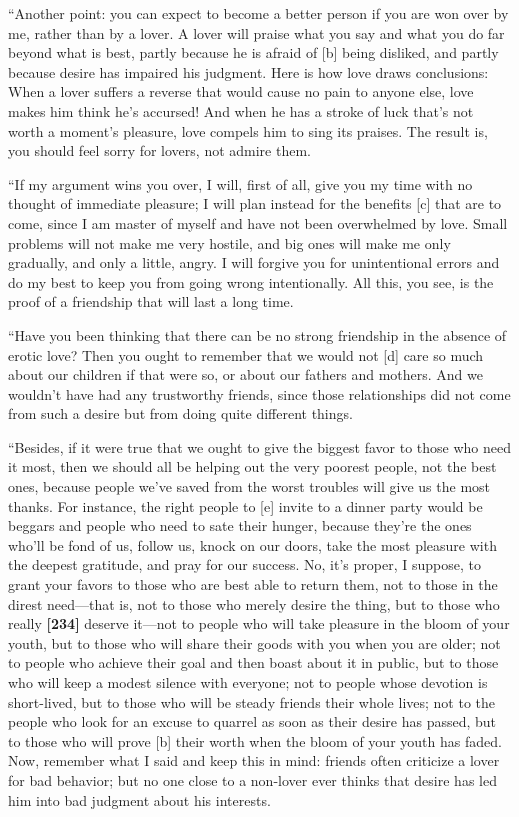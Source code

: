 “Another point: you can expect to become a better person if you are won
over by me, rather than by a lover. A lover will praise what you say and
what you do far beyond what is best, partly because he is afraid of
{[}b{]} being disliked, and partly because desire has impaired his
judgment. Here is how love draws conclusions: When a lover suffers a
reverse that would cause no pain to anyone else, love makes him think
he's accursed! And when he has a stroke of luck that's not worth a
moment's pleasure, love compels him to sing its praises. The result is,
you should feel sorry for lovers, not admire them.

“If my argument wins you over, I will, first of all, give you my time
with no thought of immediate pleasure; I will plan instead for the
benefits {[}c{]} that are to come, since I am master of myself and have
not been overwhelmed by love. Small problems will not make me very
hostile, and big ones will make me only gradually, and only a little,
angry. I will forgive you for unintentional errors and do my best to
keep you from going wrong intentionally. All this, you see, is the proof
of a friendship that will last a long time.

“Have you been thinking that there can be no strong friendship in the
absence of erotic love? Then you ought to remember that we would not
{[}d{]} care so much about our children if that were so, or about our
fathers and mothers. And we wouldn't have had any trustworthy friends,
since those relationships did not come from such a desire but from doing
quite different things.

“Besides, if it were true that we ought to give the biggest favor to
those who need it most, then we should all be helping out the very
poorest people, not the best ones, because people we've saved from the
worst troubles will give us the most thanks. For instance, the right
people to {[}e{]} invite to a dinner party would be beggars and people
who need to sate their hunger, because they're the ones who'll be fond
of us, follow us, knock on our
doors, take the most
pleasure with the deepest gratitude, and pray for our success. No, it's
proper, I suppose, to grant your favors to those who are best able to
return them, not to those in the direst need---that is, not to those who
merely desire the thing, but to those who really {\bf {[}234{]}} deserve
it---not to people who will take pleasure in the bloom of your youth,
but to those who will share their goods with you when you are older; not
to people who achieve their goal and then boast about it in public, but
to those who will keep a modest silence with everyone; not to people
whose devotion is short-lived, but to those who will be steady friends
their whole lives; not to the people who look for an excuse to quarrel
as soon as their desire has passed, but to those who will prove {[}b{]}
their worth when the bloom of your youth has faded. Now, remember what I
said and keep this in mind: friends often criticize a lover for bad
behavior; but no one close to a non-lover ever thinks that desire has
led him into bad judgment about his interests.

